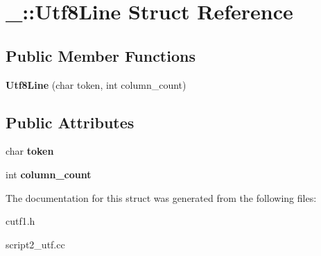 \hypertarget{struct___1_1_utf8_line}{}\section{\+\_\+\+:\+:Utf8\+Line Struct Reference}
\label{struct___1_1_utf8_line}
\subsection*{Public Member Functions}
\begin{DoxyCompactItemize}
\item 
\mbox{\label{struct___1_1_utf8_line_a34c6478ca0f09c7d36654ed47f6f7fdf}} 
{\bfseries Utf8\+Line} (char token, int column\+\_\+count)
\end{DoxyCompactItemize}
\subsection*{Public Attributes}
\begin{DoxyCompactItemize}
\item 
\mbox{\label{struct___1_1_utf8_line_a4c2bc24fda62b1031f1a121ae1da61fc}} 
char {\bfseries token}
\item 
\mbox{\label{struct___1_1_utf8_line_ada87b911edf08166ff5a01dfba8b7836}} 
int {\bfseries column\+\_\+count}
\end{DoxyCompactItemize}


The documentation for this struct was generated from the following files\+:\begin{DoxyCompactItemize}
\item 
cutf1.\+h\item 
script2\+\_\+utf.\+cc\end{DoxyCompactItemize}
